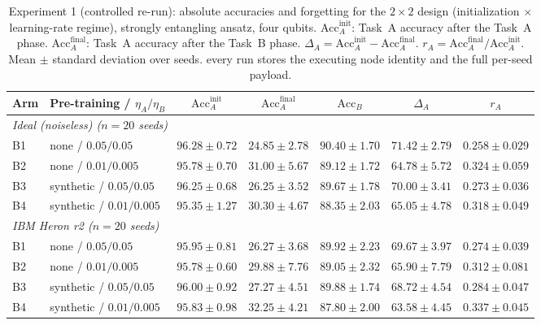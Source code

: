 \begin{table}[ht]
\centering
\small
\setlength{\tabcolsep}{3.5pt}
\caption{Experiment 1 (controlled re-run): absolute accuracies and forgetting for the $2{\times}2$ design (initialization $\times$ learning-rate regime), strongly entangling ansatz, four qubits. $\text{Acc}_A^{\text{init}}$: Task~A accuracy after the Task~A phase. $\text{Acc}_A^{\text{final}}$: Task~A accuracy after the Task~B phase. $\Delta_A = \text{Acc}_A^{\text{init}} - \text{Acc}_A^{\text{final}}$. $r_A = \text{Acc}_A^{\text{final}} / \text{Acc}_A^{\text{init}}$. Mean $\pm$ standard deviation over seeds. every run stores the executing node identity and the full per-seed payload.}
\label{tab:exp1_controlled}
\begin{tabular}{llccccc}
\toprule
Arm & Pre-training / $\eta_A/\eta_B$ & $\text{Acc}_A^{\text{init}}$ & $\text{Acc}_A^{\text{final}}$ & $\text{Acc}_B$ & $\Delta_A$ & $r_A$ \\
\midrule
\multicolumn{7}{l}{\textit{Ideal (noiseless) ($n=20$ seeds)}} \\
B1 & none / $0.05/0.05$ & $96.28 \pm 0.72$ & $24.85 \pm 2.78$ & $90.40 \pm 1.70$ & $71.42 \pm 2.79$ & $0.258 \pm 0.029$ \\
B2 & none / $0.01/0.005$ & $95.78 \pm 0.70$ & $31.00 \pm 5.67$ & $89.12 \pm 1.72$ & $64.78 \pm 5.72$ & $0.324 \pm 0.059$ \\
B3 & synthetic / $0.05/0.05$ & $96.25 \pm 0.68$ & $26.25 \pm 3.52$ & $89.67 \pm 1.78$ & $70.00 \pm 3.41$ & $0.273 \pm 0.036$ \\
B4 & synthetic / $0.01/0.005$ & $95.35 \pm 1.27$ & $30.30 \pm 4.67$ & $88.35 \pm 2.03$ & $65.05 \pm 4.78$ & $0.318 \pm 0.049$ \\
\midrule
\multicolumn{7}{l}{\textit{IBM Heron r2 ($n=20$ seeds)}} \\
B1 & none / $0.05/0.05$ & $95.95 \pm 0.81$ & $26.27 \pm 3.68$ & $89.92 \pm 2.23$ & $69.67 \pm 3.97$ & $0.274 \pm 0.039$ \\
B2 & none / $0.01/0.005$ & $95.78 \pm 0.60$ & $29.88 \pm 7.76$ & $89.05 \pm 2.32$ & $65.90 \pm 7.79$ & $0.312 \pm 0.081$ \\
B3 & synthetic / $0.05/0.05$ & $96.00 \pm 0.92$ & $27.27 \pm 4.51$ & $89.88 \pm 1.74$ & $68.72 \pm 4.54$ & $0.284 \pm 0.047$ \\
B4 & synthetic / $0.01/0.005$ & $95.83 \pm 0.98$ & $32.25 \pm 4.21$ & $87.80 \pm 2.00$ & $63.58 \pm 4.45$ & $0.337 \pm 0.045$ \\
\bottomrule
\end{tabular}
\end{table}
